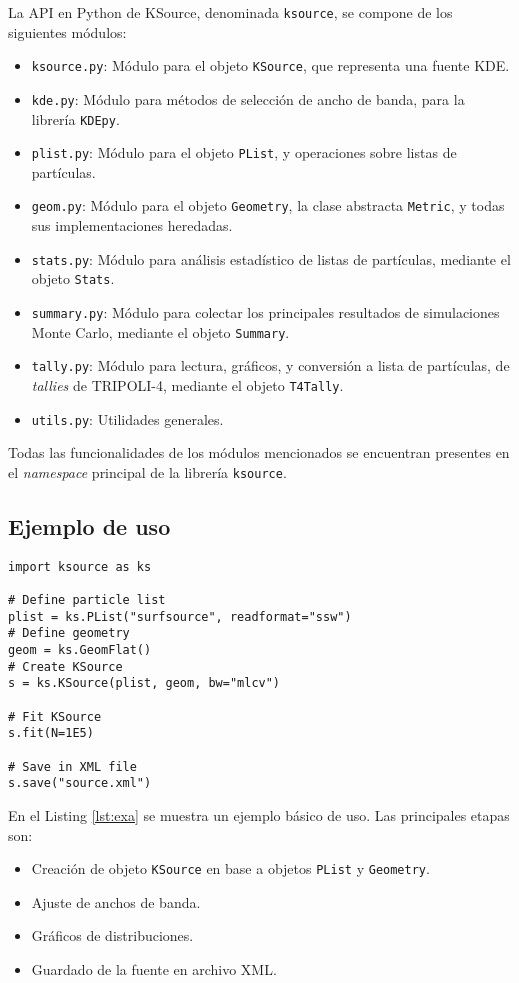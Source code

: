 La API en Python de KSource, denominada \verb|ksource|, se compone de los siguientes módulos:
\begin{itemize}
	\item \verb|ksource.py|: Módulo para el objeto \verb|KSource|, que representa una fuente KDE.
	\item \verb|kde.py|: Módulo para métodos de selección de ancho de banda, para la librería \verb|KDEpy|.
	\item \verb|plist.py|: Módulo para el objeto \verb|PList|, y operaciones sobre listas de partículas.
	\item \verb|geom.py|: Módulo para el objeto \verb|Geometry|, la clase abstracta \verb|Metric|, y todas sus implementaciones heredadas.
	\item \verb|stats.py|: Módulo para análisis estadístico de listas de partículas, mediante el objeto \verb|Stats|.
	\item \verb|summary.py|: Módulo para colectar los principales resultados de simulaciones Monte Carlo, mediante el objeto \verb|Summary|.
	\item \verb|tally.py|: Módulo para lectura, gráficos, y conversión a lista de partículas, de \emph{tallies} de TRIPOLI-4, mediante el objeto \verb|T4Tally|.
	\item \verb|utils.py|: Utilidades generales.
\end{itemize}

Todas las funcionalidades de los módulos mencionados se encuentran presentes en el \emph{namespace} principal de la librería \verb|ksource|.


\subsection{Ejemplo de uso}

\begin{lstlisting}[language=Python2, label={lst:exa}, caption=Ejemplo básico de uso de API en Python.]
import ksource as ks

# Define particle list
plist = ks.PList("surfsource", readformat="ssw")
# Define geometry
geom = ks.GeomFlat()
# Create KSource
s = ks.KSource(plist, geom, bw="mlcv")

# Fit KSource
s.fit(N=1E5)

# Save in XML file
s.save("source.xml")
\end{lstlisting}

En el Listing \ref{lst:exa} se muestra un ejemplo básico de uso. Las principales etapas son:
\begin{itemize}
	\item Creación de objeto \verb|KSource| en base a objetos \verb|PList| y \verb|Geometry|.
	\item Ajuste de anchos de banda.
	\item Gráficos de distribuciones.
	\item Guardado de la fuente en archivo XML.
\end{itemize}

